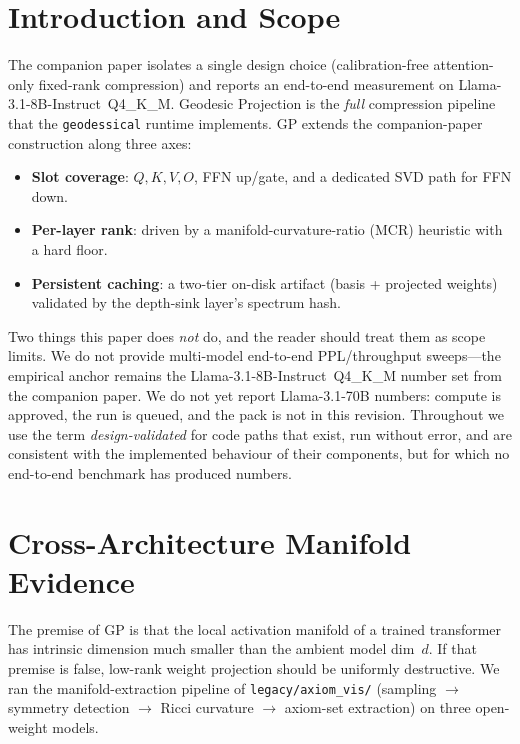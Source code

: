 \documentclass[11pt]{article}
\begin{document}
\section{Introduction and Scope}
The companion paper isolates a single design choice (calibration-free
attention-only fixed-rank compression) and reports an end-to-end measurement
on Llama-3.1-8B-Instruct~Q4\_K\_M.  Geodesic Projection is the
\emph{full} compression pipeline that the \texttt{geodessical} runtime
implements.  GP extends the companion-paper construction along three axes:
\begin{itemize}
\item \textbf{Slot coverage}: $Q,K,V,O$, FFN up/gate, and a dedicated SVD
path for FFN down.
\item \textbf{Per-layer rank}: driven by a manifold-curvature-ratio (MCR)
heuristic with a hard floor.
\item \textbf{Persistent caching}: a two-tier on-disk artifact (basis +
projected weights) validated by the depth-sink layer's spectrum hash.
\end{itemize}
Two things this paper does \emph{not} do, and the reader should treat them
as scope limits.  We do not provide multi-model end-to-end PPL/throughput
sweeps---the empirical anchor remains the Llama-3.1-8B-Instruct~Q4\_K\_M
number set from the companion paper.  We do not yet report Llama-3.1-70B
numbers: compute is approved, the run is queued, and the pack is not in this
revision.  Throughout we use the term \emph{design-validated} for code paths
that exist, run without error, and are consistent with the implemented
behaviour of their components, but for which no end-to-end benchmark has
produced numbers.

\section{Cross-Architecture Manifold Evidence}
\label{sec:manifold}
The premise of GP is that the local activation manifold of a trained
transformer has intrinsic dimension much smaller than the ambient model
dim~$d$.  If that premise is false, low-rank weight projection should be
uniformly destructive.  We ran the manifold-extraction pipeline of
\texttt{legacy/axiom\_vis/} (sampling $\to$ symmetry detection $\to$ Ricci
curvature $\to$ axiom-set extraction) on three open-weight models.
\end{document}
